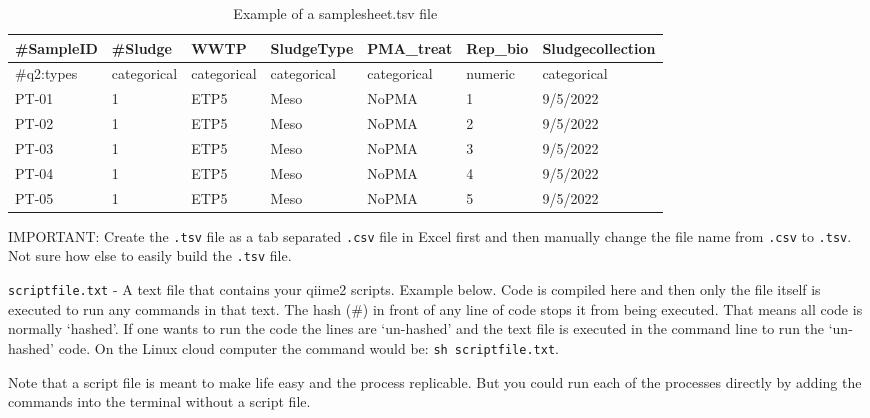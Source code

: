 \documentclass[
]{book}
\begin{document}
\begin{table}

\caption{\label{tab:metadata}Example of a samplesheet.tsv file}
\centering
\fontsize{10}{12}\selectfont
\begin{tabular}[t]{l|l|l|l|l|l|l}
\hline
\#SampleID & \#Sludge & WWTP & SludgeType & PMA\_treat & Rep\_bio & Sludgecollection\\
\hline
\#q2:types & categorical & categorical & categorical & categorical & numeric & categorical\\
\hline
PT-01 & 1 & ETP5 & Meso & NoPMA & 1 & 9/5/2022\\
\hline
PT-02 & 1 & ETP5 & Meso & NoPMA & 2 & 9/5/2022\\
\hline
PT-03 & 1 & ETP5 & Meso & NoPMA & 3 & 9/5/2022\\
\hline
PT-04 & 1 & ETP5 & Meso & NoPMA & 4 & 9/5/2022\\
\hline
PT-05 & 1 & ETP5 & Meso & NoPMA & 5 & 9/5/2022\\
\hline
\end{tabular}
\end{table}

\hfill\break

IMPORTANT: Create the \texttt{.tsv} file as a tab separated \texttt{.csv} file in Excel first and then manually change the file name from \texttt{.csv} to \texttt{.tsv}. Not sure how else to easily build the \texttt{.tsv} file.

\hfill\break

\texttt{scriptfile.txt} - A text file that contains your qiime2 scripts. Example below. Code is compiled here and then only the file itself is executed to run any commands in that text. The hash (\#) in front of any line of code stops it from being executed. That means all code is normally `hashed'. If one wants to run the code the lines are `un-hashed' and the text file is executed in the command line to run the `un-hashed' code. On the Linux cloud computer the command would be: \texttt{sh\ scriptfile.txt}.

Note that a script file is meant to make life easy and the process replicable. But you could run each of the processes directly by adding the commands into the terminal without a script file.
\end{document}
